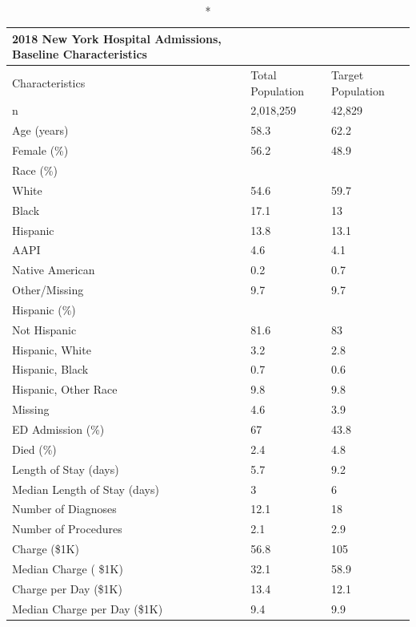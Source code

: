 \documentclass[preprint, 3p,
authoryear]{elsarticle} %
\begin{document}
\captionsetup[table]{labelformat=empty,skip=1pt}
\begin{longtable}{lll}
\caption*{
{\large 2018 New York Hospital Admissions, Baseline Characteristics}
} \\ 
\toprule
Characteristics & Total Population & Target Population \\ 
\midrule
n & 2,018,259 & 42,829 \\ 
Age (years) & 58.3 & 62.2 \\ 
Female (\%) & 56.2 & 48.9 \\ 
Race (\%) &   &   \\ 
     White & 54.6 & 59.7 \\ 
     Black & 17.1 & 13 \\ 
     Hispanic & 13.8 & 13.1 \\ 
     AAPI & 4.6 & 4.1 \\ 
     Native American & 0.2 & 0.7 \\ 
     Other/Missing & 9.7 & 9.7 \\ 
Hispanic (\%) &   &   \\ 
     Not Hispanic & 81.6 & 83 \\ 
     Hispanic, White & 3.2 & 2.8 \\ 
     Hispanic, Black & 0.7 & 0.6 \\ 
     Hispanic, Other Race & 9.8 & 9.8 \\ 
     Missing & 4.6 & 3.9 \\ 
ED Admission (\%) & 67 & 43.8 \\ 
Died (\%) & 2.4 & 4.8 \\ 
Length of Stay (days) & 5.7 & 9.2 \\ 
Median Length of Stay (days) & 3 & 6 \\ 
Number of Diagnoses & 12.1 & 18 \\ 
Number of Procedures & 2.1 & 2.9 \\ 
Charge (\$1K) & 56.8 & 105 \\ 
Median Charge ( \$1K) & 32.1 & 58.9 \\ 
Charge per Day (\$1K) & 13.4 & 12.1 \\ 
Median Charge per Day (\$1K) & 9.4 & 9.9 \\ 
\bottomrule
\end{longtable}
\end{document}
